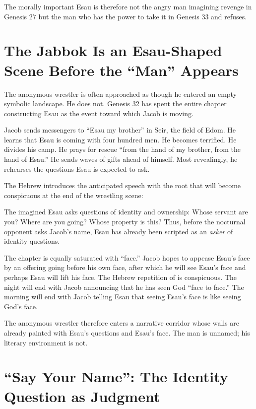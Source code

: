 The morally important Esau is therefore not the angry man imagining revenge in Genesis 27 but the man who has the power to take it in Genesis 33 and refuses.

\section{The Jabbok Is an Esau-Shaped Scene Before the ``Man'' Appears}

The anonymous wrestler is often approached as though he entered an empty symbolic landscape. He does not. Genesis 32 has spent the entire chapter constructing Esau as the event toward which Jacob is moving.

Jacob sends messengers to ``Esau my brother'' in Seir, the field of Edom. He learns that Esau is coming with four hundred men. He becomes terrified. He divides his camp. He prays for rescue ``from the hand of my brother, from the hand of Esau.'' He sends waves of gifts ahead of himself. Most revealingly, he rehearses the questions Esau is expected to ask.

The Hebrew introduces the anticipated speech with the root that will become conspicuous at the end of the wrestling scene:


The imagined Esau asks questions of identity and ownership: Whose servant are you? Where are you going? Whose property is this? Thus, before the nocturnal opponent asks Jacob's name, Esau has already been scripted as an \emph{asker} of identity questions.

The chapter is equally saturated with ``face.'' Jacob hopes to appease Esau's face by an offering going before his own face, after which he will see Esau's face and perhaps Esau will lift his face. The Hebrew repetition of  is conspicuous. The night will end with Jacob announcing that he has seen God ``face to face.'' The morning will end with Jacob telling Esau that seeing Esau's face is like seeing God's face.

The anonymous wrestler therefore enters a narrative corridor whose walls are already painted with Esau's questions and Esau's face. The man is unnamed; his literary environment is not.

\section{``Say Your Name'': The Identity Question as Judgment}

